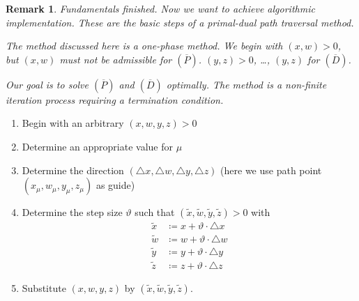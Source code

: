 \documentclass[a4paper]{article}
\numberwithin{lecref}{section}
\newtheorem*{Remark}{Remark}
\begin{document}
\begin{Remark}
	Fundamentals finished. Now we want to achieve algorithmic implementation.
	These are the basic steps of a primal-dual path traversal method.

	The method discussed here is a one-phase method.
	We begin with $(x, w) > 0$, but $(x, w)$ must not be admissible for $(\overline P)$.
	$(y, z) > 0$, \dots, $(y, z)$ for $(\overline D)$.

	Our goal is to solve $(\overline P)$ and $(\overline D)$ optimally.
	The method is a non-finite iteration process requiring a termination condition.
\end{Remark}

\begin{enumerate}
	\item[0.] Begin with an arbitrary $(x, w, y, z) > 0$
	\item[1.] Determine an appropriate value for $\mu$
	\item[2.] Determine the direction $(\triangle x, \triangle w, \triangle y, \triangle z)$ (here we use path point $(x_\mu, w_\mu, y_\mu, z_\mu)$ as guide)
	\item[3.] Determine the step size $\vartheta$ such that $(\tilde x, \tilde w, \tilde y, \tilde z) > 0$ with
		\begin{align*}
			\tilde x &\coloneqq x + \vartheta \cdot \triangle x \\
			\tilde w &\coloneqq w + \vartheta \cdot \triangle w \\
			\tilde y &\coloneqq y + \vartheta \cdot \triangle y \\
			\tilde z &\coloneqq z + \vartheta \cdot \triangle z
		\end{align*}
	\item[4.] Substitute $(x, w, y, z)$ by $(\tilde x, \tilde w, \tilde y, \tilde z)$.
\end{enumerate}
\end{document}
